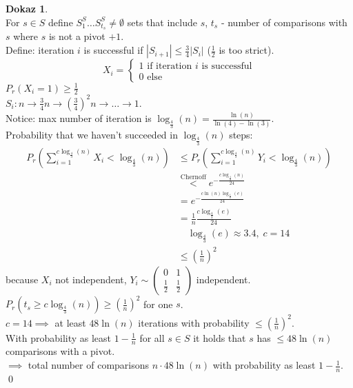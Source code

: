 \documentclass[a4paper, 12pt]{book}
\theoremstyle{definition}
\newtheorem{pro}[counter]{Dokaz}
\theoremstyle{remark}
\begin{document}
\begin{pro} \text{} \\
  For $s \in S$ define $S_1^S \dots S_{t_s}^S \neq \emptyset$ sets that include $s$,
  $t_s$ - number of comparisons with $s$ where $s$ is not a pivot $+1$. \\
  Define: iteration $i$ is successful if $|S_{i+1}| \leq \frac{3}{4} |S_i|$ ($\frac{1}{2}$ is too strict).
  \begin{equation*}
    X_i = \begin{cases}
      1 \text{ if iteration } i \text{ is successful} \\
      0 \text{ else}
    \end{cases}
  \end{equation*}
  $P_r(X_i = 1) \geq \frac{1}{2}$ \\
  $S_i: n \to \frac{3}{4} n \to (\frac{3}{4})^2 n \to \dots \to 1$. \\
  Notice: max number of iteration is $\log_{\frac{4}{3}}(n) = \frac{\ln(n)}{\ln(4)-\ln(3)}$. \\
  Probability that we haven't succeeded in $\log_{\frac{4}{3}}(n)$ steps:
  \begin{align}
    P_r(\sum_{i=1}^{c \log_{\frac{4}{3}}(n)} X_i < \log_{\frac{4}{3}}(n)) &\leq
      P_r(\sum_{i=1}^{c \log_{\frac{4}{3}}(n)} Y_i < \log_{\frac{4}{3}}(n)) \label{eq:X_to_Y} \\
    &\stackrel{\text{Chernoff}}{<} e^{-\frac{c \log_{\frac{4}{3}}(n)}{24}} \\
    &= e^{-\frac{c \ln(n) \log_{\frac{4}{3}}(e)}{24}} \\
    &= \frac{1}{n} \frac{c \log_{\frac{4}{3}}(e)}{24} \\
    &\quad \log_{\frac{4}{3}}(e) \approx 3.4, \; c=14 \\
    &\leq \left(\frac{1}{n}\right)^2
  \end{align}
   because $X_i$ not independent,
  $Y_i \sim \begin{pmatrix}0 & 1 \\ \frac{1}{2} & \frac{1}{2}\end{pmatrix}$ independent. \\
  $P_r(t_s \geq c \log_{\frac{4}{3}}(n)) \geq \left(\frac{1}{n}\right)^2$ for one $s$. \\
  $c=14 \implies$ at least $48 \ln(n)$ iterations with probability $\leq \left(\frac{1}{n}\right)^2$. \\
  With probability as least $1-\frac{1}{n}$ for all $s \in S$ it holds that $s$ has $\leq 48 \ln(n)$ comparisons with a pivot. \\
  $\implies$ total number of comparisons $n \cdot 48 \ln(n)$ with probability as least $1 - \frac{1}{n}$.
  \qed
\end{pro}
\end{document}
